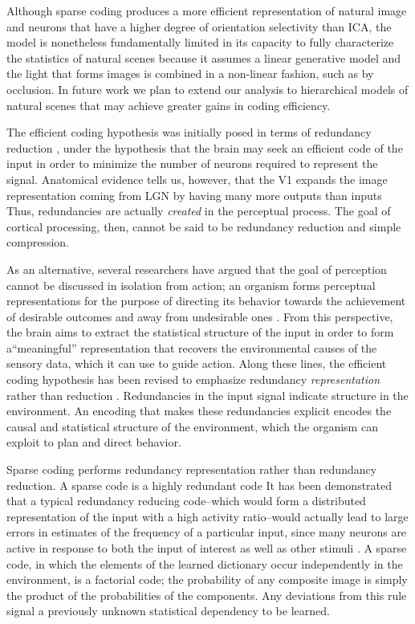 Although sparse coding produces a more efficient representation of natural image and neurons that have a higher degree of orientation selectivity than ICA, the model is nonetheless fundamentally limited in its capacity to fully characterize the statistics of natural scenes because it assumes a linear generative model and the light that forms images is combined in a non-linear fashion, such as by occlusion. In future work we plan to extend our analysis to hierarchical models of natural scenes that may achieve greater gains in coding efficiency.

The efficient coding hypothesis was initially posed in terms of redundancy reduction \parencite{barlow1961possible}, under the hypothesis that the brain may seek an efficient code of the input in order to minimize the number of neurons required to represent the signal. Anatomical evidence tells us, however, that the V1 expands the image representation coming from LGN by having many more outputs than inputs \parencite{olshausen2003principles} Thus, redundancies are actually \textit{created} in the perceptual process. The goal of cortical processing, then, cannot be said to be redundancy reduction and simple compression.

As an alternative, several researchers have argued that the goal of perception cannot be discussed in isolation from action; an organism forms perceptual representations for the purpose of directing its behavior towards the achievement of desirable outcomes and away from undesirable ones \parencite{barlow2001redundancy, simoncelli2001natural}. From this perspective, the brain aims to extract the statistical structure of the input in order to form a``meaningful'' representation that recovers the environmental causes of the sensory data, which it can use to guide action. Along these lines, the efficient coding hypothesis has been revised to emphasize redundancy \textit{representation} rather than reduction \parencite{barlow2001redundancy}. Redundancies in the input signal indicate structure in the environment. An encoding that makes these redundancies explicit encodes the causal and statistical structure of the environment, which the organism can exploit to plan and direct behavior.

Sparse coding performs redundancy representation rather than redundancy reduction. A sparse code is a highly redundant code It has been demonstrated that a typical redundancy reducing code--which would form a distributed representation of the input with a high activity ratio--would actually lead to large errors in estimates of the frequency of a particular input, since many neurons are active in response to both the input of interest as well as other stimuli \parencite{gardnermedwin2001limits}. A sparse code, in which the elements of the learned dictionary occur independently in the environment, is a factorial code; the probability of any composite image is simply the product of the probabilities of the components. Any deviations from this rule signal a previously unknown statistical dependency to be learned.

